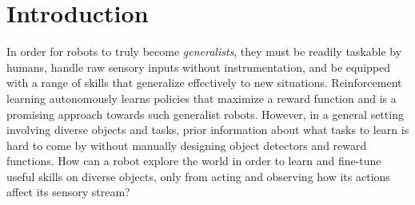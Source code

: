 
\section{Introduction}

In order for robots to truly become \emph{generalists}, they must be readily taskable by humans, handle raw sensory inputs without instrumentation, and be equipped with a range of skills that generalize effectively to new situations.
Reinforcement learning autonomously learns policies that maximize a reward function and is a promising approach towards such generalist robots. However, in a general setting involving diverse objects and tasks, prior information about what tasks to learn is hard to come by without manually designing object detectors and reward functions.
How can a robot explore the world in order to learn and fine-tune useful skills on diverse objects, only from acting and observing how its actions affect its sensory stream?

